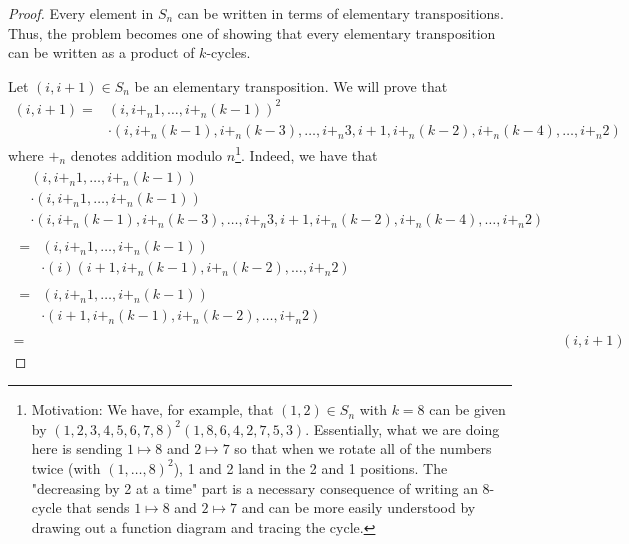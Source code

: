 \documentclass[../psets.tex]{subfiles}
\begin{document}
\begin{enumerate}
\begin{proof}
        Every element in $S_n$ can be written in terms of elementary transpositions. Thus, the problem becomes one of showing that every elementary transposition can be written as a product of $k$-cycles.\par
        Let $(i,i+1)\in S_n$ be an elementary transposition. We will prove that
        \begin{equation*}
            \begin{split}
                (i,i+1) ={}& (i,i+_n1,\dots,i+_n(k-1))^2\\
                &\cdot (i,i+_n(k-1),i+_n(k-3),\dots,i+_n3,i+1,i+_n(k-2),i+_n(k-4),\dots,i+_n2)
            \end{split}
        \end{equation*}
        where $+_n$ denotes addition modulo $n$\footnote{Motivation: We have, for example, that $(1,2)\in S_n$ with $k=8$ can be given by $(1,2,3,4,5,6,7,8)^2(1,8,6,4,2,7,5,3)$. Essentially, what we are doing here is sending $1\mapsto 8$ and $2\mapsto 7$ so that when we rotate all of the numbers twice (with $(1,\dots,8)^2$), 1 and 2 land in the 2 and 1 positions. The "decreasing by 2 at a time" part is a necessary consequence of writing an 8-cycle that sends $1\mapsto 8$ and $2\mapsto 7$ and can be more easily understood by drawing out a function diagram and tracing the cycle.}. Indeed, we have that
        \begin{align*}
            \begin{split}
                & (i,i+_n1,\dots,i+_n(k-1))\\
                &\cdot (i,i+_n1,\dots,i+_n(k-1))\\
                &\cdot (i,i+_n(k-1),i+_n(k-3),\dots,i+_n3,i+1,i+_n(k-2),i+_n(k-4),\dots,i+_n2)
            \end{split}\\
            \begin{split}
                ={}& (i,i+_n1,\dots,i+_n(k-1))\\
                &\cdot (i)(i+1,i+_n(k-1),i+_n(k-2),\dots,i+_n2)
            \end{split}\\
            \begin{split}
                ={}& (i,i+_n1,\dots,i+_n(k-1))\\
                &\cdot (i+1,i+_n(k-1),i+_n(k-2),\dots,i+_n2)
            \end{split}\\
            ={}& (i,i+1)
        \end{align*}

\end{proof}
\end{enumerate}
\end{document}
